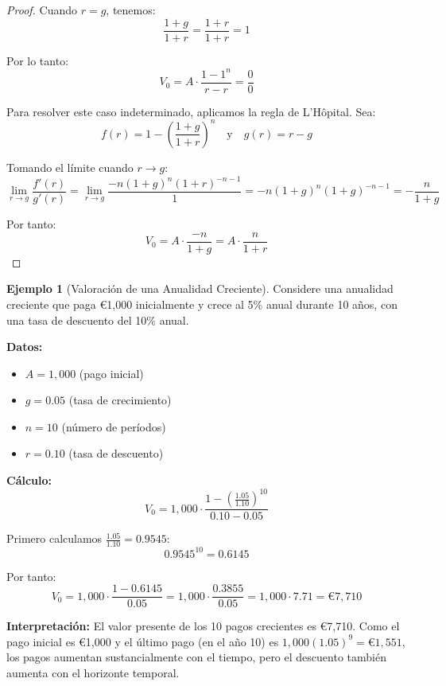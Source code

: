 \documentclass[12pt,a4paper]{article}
\theoremstyle{definition}
\newtheorem{ejemplo}{Ejemplo}[section]
\begin{document}
\begin{proof}
Cuando $r = g$, tenemos:
$$\frac{1 + g}{1 + r} = \frac{1 + r}{1 + r} = 1$$

Por lo tanto:
$$V_0 = A \cdot \frac{1 - 1^n}{r - r} = \frac{0}{0}$$

Para resolver este caso indeterminado, aplicamos la regla de L'Hôpital. Sea:
$$f(r) = 1 - \left(\frac{1 + g}{1 + r}\right)^n \quad \text{y} \quad g(r) = r - g$$

Tomando el límite cuando $r \to g$:
$$\lim_{r \to g} \frac{f'(r)}{g'(r)} = \lim_{r \to g} \frac{-n(1 + g)^n(1 + r)^{-n-1}}{1} = -n(1 + g)^n(1 + g)^{-n-1} = -\frac{n}{1 + g}$$

Por tanto:
$$V_0 = A \cdot \frac{-n}{1 + g} = A \cdot \frac{n}{1 + r}$$
\end{proof}

\begin{center}
    
\end{center}

\begin{ejemplo}[Valoración de una Anualidad Creciente]
Considere una anualidad creciente que paga €1,000 inicialmente y crece al 5\% anual durante 10 años, con una tasa de descuento del 10\% anual.

\textbf{Datos:}
\begin{itemize}
\item $A = 1{,}000$ (pago inicial)
\item $g = 0.05$ (tasa de crecimiento)
\item $n = 10$ (número de períodos)
\item $r = 0.10$ (tasa de descuento)
\end{itemize}

\textbf{Cálculo:}
$$V_0 = 1{,}000 \cdot \frac{1 - \left(\frac{1.05}{1.10}\right)^{10}}{0.10 - 0.05}$$

Primero calculamos $\frac{1.05}{1.10} = 0.9545$:
$$0.9545^{10} = 0.6145$$

Por tanto:
$$V_0 = 1{,}000 \cdot \frac{1 - 0.6145}{0.05} = 1{,}000 \cdot \frac{0.3855}{0.05} = 1{,}000 \cdot 7.71 = \text{€}7{,}710$$

\textbf{Interpretación:} El valor presente de los 10 pagos crecientes es €7,710. Como el pago inicial es €1,000 y el último pago (en el año 10) es $1{,}000(1.05)^9 = \text{€}1{,}551$, los pagos aumentan sustancialmente con el tiempo, pero el descuento también aumenta con el horizonte temporal.
\end{ejemplo}
\end{document}
